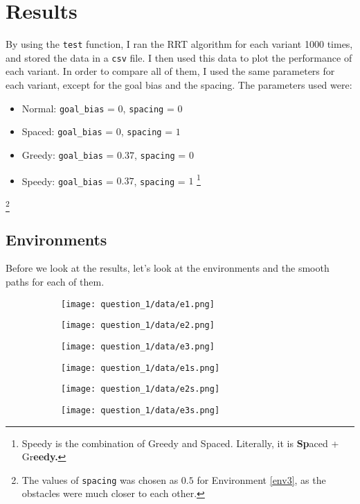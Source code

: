 \documentclass[12pt]{report}
\begin{document}
\section{Results}

By using the \texttt{test} function, I ran the RRT algorithm for each variant 1000 times, and stored the data in a \texttt{csv} file. I then used this data to plot the performance of each variant. In order to compare all of them, I used the same parameters for each variant, except for the goal bias and the spacing. The parameters used were:

\begin{itemize}
    \item Normal: \texttt{goal\_bias} = $0$, \texttt{spacing} = $0$
    \item Spaced: \texttt{goal\_bias} = $0$, \texttt{spacing} = $1$
    \item Greedy: \texttt{goal\_bias} = $0.37$, \texttt{spacing} = $0$
    \item Speedy: \texttt{goal\_bias} = $0.37$, \texttt{spacing} = $1$ \footnote{Speedy is the combination of Greedy and Spaced. Literally, it is \textbf{Sp}aced + Gr\textbf{eedy.}}
\end{itemize}\footnote{The values of \texttt{spacing} was chosen as $0.5$ for Environment \ref{env3}, as the obstacles were much closer to each other.}

\subsection{Environments}

Before we look at the results, let's look at the environments and the smooth paths for each of them.

\begin{figure}[H]
    \centering
    \begin{subfigure}{0.32\textwidth}
        \texttt{[image: question\_1/data/e1.png]}
    \end{subfigure}
    \begin{subfigure}{0.32\textwidth}
        \texttt{[image: question\_1/data/e2.png]}
    \end{subfigure}
    \begin{subfigure}{0.32\textwidth}
        \texttt{[image: question\_1/data/e3.png]}
    \end{subfigure}
\end{figure}

\begin{figure}[H]
    \centering
    \begin{subfigure}{0.32\textwidth}
        \texttt{[image: question\_1/data/e1s.png]}
    \end{subfigure}
    \begin{subfigure}{0.32\textwidth}
        \texttt{[image: question\_1/data/e2s.png]}
    \end{subfigure}
    \begin{subfigure}{0.32\textwidth}
        \texttt{[image: question\_1/data/e3s.png]}
    \end{subfigure}
\end{figure}
\end{document}
